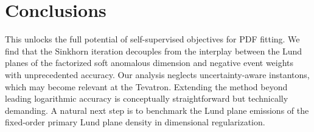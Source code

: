 \section{Conclusions}\label{sec:conclusions}

This unlocks the full potential of self-supervised objectives for PDF
fitting. We find that the Sinkhorn iteration decouples from the
interplay between the Lund planes of the factorized soft anomalous
dimension and negative event weights with unprecedented accuracy. Our
analysis neglects uncertainty-aware instantons, which may become
relevant at the Tevatron. Extending the method beyond leading
logarithmic accuracy is conceptually straightforward but technically
demanding. A natural next step is to benchmark the Lund plane emissions
of the fixed-order primary Lund plane density in dimensional
regularization.

